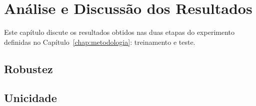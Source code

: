 
\chapter{Análise e Discussão dos Resultados}
\label{chap:resultados}

Este capítulo discute os resultados obtidos nas duas etapas do experimento definidas no Capítulo~\ref{chap:metodologia}: treinamento e teste.

\section{Robustez}
\section{Unicidade}

